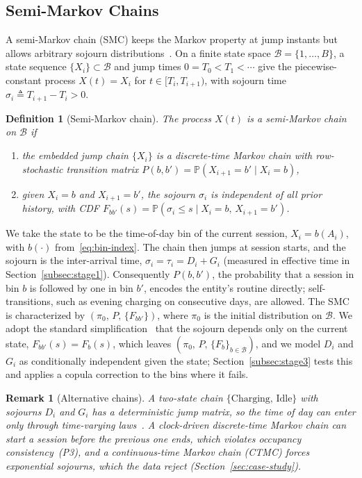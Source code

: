\documentclass[journal]{IEEEtran}
\newtheorem{definition}{Definition}
\newtheorem{remark}{Remark}
\begin{document}
\subsection{Semi-Markov Chains}
\label{subsec:smc-formal-def}

A semi-Markov chain (SMC) keeps the Markov property at jump instants but allows arbitrary sojourn distributions~\cite{barbu2009semi}. On a finite state space $\mathcal{B} = \{1, \ldots, B\}$, a state sequence $\{X_i\} \subset \mathcal{B}$ and jump times $0 = T_0 < T_1 < \cdots$ give the piecewise-constant process $X(t) = X_i$ for $t \in [T_i, T_{i+1})$, with sojourn time $\sigma_i \triangleq T_{i+1} - T_i > 0$.

\begin{definition}[Semi-Markov chain]
\label{def:smc}
The process $X(t)$ is a \emph{semi-Markov chain} on $\mathcal{B}$ if
\begin{enumerate}
    \item the embedded jump chain $\{X_i\}$ is a discrete-time Markov chain with row-stochastic transition matrix $P(b, b') = \mathbb{P}(X_{i+1} = b' \mid X_i = b)$,
    \item given $X_i = b$ and $X_{i+1} = b'$, the sojourn $\sigma_i$ is independent of all prior history, with CDF $F_{bb'}(s) = \mathbb{P}(\sigma_i \leq s \mid X_i = b,\, X_{i+1} = b')$.
\end{enumerate}
\end{definition}

We take the state to be the time-of-day bin of the current session, $X_i = b(A_i)$, with $b(\cdot)$ from~\eqref{eq:bin-index}. The chain then jumps at session starts, and the sojourn is the inter-arrival time, $\sigma_i = \tau_i = D_i + G_i$ (measured in effective time in Section~\ref{subsec:stage1}). Consequently $P(b, b')$, the probability that a session in bin $b$ is followed by one in bin $b'$, encodes the entity's routine directly; self-transitions, such as evening charging on consecutive days, are allowed. The SMC is characterized by $(\pi_0,\, P,\, \{F_{bb'}\})$, where $\pi_0$ is the initial distribution on $\mathcal{B}$. We adopt the standard simplification~\cite{barbu2009semi} that the sojourn depends only on the current state, $F_{bb'}(s) = F_b(s)$, which leaves $(\pi_0,\, P,\, \{F_b\}_{b \in \mathcal{B}})$, and we model $D_i$ and $G_i$ as conditionally independent given the state; Section~\ref{subsec:stage3} tests this and applies a copula correction to the bins where it fails.

\begin{remark}[Alternative chains]
\label{rem:alt-chains}
A two-state chain $\{\text{Charging},\, \text{Idle}\}$ with sojourns $D_i$ and $G_i$ has a deterministic jump matrix, so the time of day can enter only through time-varying laws~\cite{iversen2016inhomogeneous,helmus2022validated}. A clock-driven discrete-time Markov chain can start a session before the previous one ends, which violates occupancy consistency~(P3), and a continuous-time Markov chain (CTMC) forces exponential sojourns, which the data reject (Section~\ref{sec:case-study}).
\end{remark}
\end{document}
